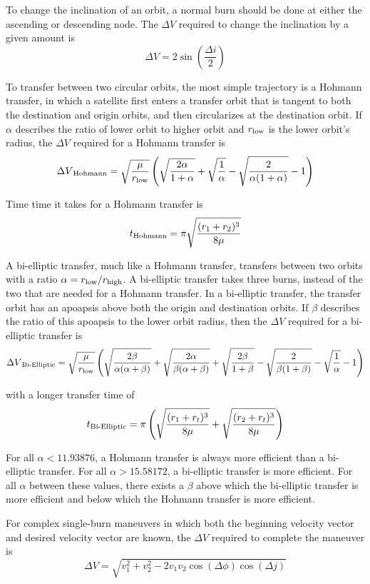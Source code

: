 \documentclass[../basicOrbitalDynamics.tex]{subfiles}
\begin{document}
\bigskip
To change the inclination of an orbit, a normal burn should be done at either the ascending or descending node. The $\Delta V$ required to change the inclination by a given amount is
\[\Delta V=2\sin\left(\frac{\Delta i}{2}\right)\]

\bigskip
To transfer between two circular orbits, the most simple trajectory is a Hohmann transfer, in which a satellite first enters a transfer orbit that is tangent to both the destination and origin orbits, and then circularizes at the destination orbit. If $\alpha$ describes the ratio of lower orbit to higher orbit and ${r}_\text{low}$ is the lower orbit's radius, the $\Delta V$ required for a Hohmann transfer is
\[{\Delta V}_\text{Hohmann} = \sqrt{\frac{\mu}{{r}_\text{low}}}\left(\sqrt{\frac{2\alpha}{1+\alpha}}+\sqrt{\frac{1}{\alpha}}-\sqrt{\frac{2}{\alpha(1+\alpha)}}-1\right)\]

Time time it takes for a Hohmann transfer is
\[{t}_\text{Hohmann}=\pi\sqrt{\frac{(r_1+r_2)^3}{8\mu}}\]

\bigskip
A bi-elliptic transfer, much like a Hohmann transfer, transfers between two orbits with a ratio $\alpha={r}_\text{low}/{r}_\text{high}$. A bi-elliptic transfer takes three burns, instead of the two that are needed for a Hohmann transfer. In a bi-elliptic transfer, the transfer orbit has an apoapsis above both the origin and destination orbits. If $\beta$ describes the ratio of this apoapsis to the lower orbit radius, then the $\Delta V$ required for a bi-elliptic transfer is
\[{\Delta V}_\text{Bi-Elliptic} = \sqrt{\frac{\mu}{{r}_\text{low}}}\left(\sqrt{\frac{2\beta}{\alpha(\alpha+\beta)}}+\sqrt{\frac{2\alpha}{\beta(\alpha+\beta)}}+\sqrt{\frac{2\beta}{1+\beta}}-\sqrt{\frac{2}{\beta(1+\beta)}}-\sqrt{\frac{1}{\alpha}}-1\right)\]

with a longer transfer time of
\[{t}_\text{Bi-Elliptic}=\pi\left(\sqrt{\frac{(r_1+r_t)^3}{8\mu}}+\sqrt{\frac{(r_2+r_t)^3}{8\mu}}\right)\]

For all $\alpha<11.93876$, a Hohmann transfer is always more efficient than a bi-elliptic transfer. For all $\alpha>15.58172$, a bi-elliptic transfer is more efficient. For all $\alpha$ between these values, there exists a $\beta$ above which the bi-elliptic transfer is more efficient and below which the Hohmann transfer is more efficient.

\bigskip

For complex single-burn maneuvers in which both the beginning velocity vector and desired velocity vector are known, the $\Delta V$ required to complete the maneuver is
\[\Delta V = \sqrt{v_1^2+v_2^2-2v_1v_2\cos(\Delta \phi)\cos(\Delta j)}\]
\end{document}
